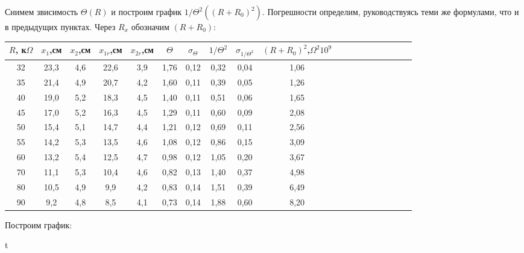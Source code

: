 \documentclass[14pt]{article}
\begin{document}
Снимем звисимость $\Theta(R)$ и построим график $1/\Theta^2((R + R_0)^2)$. Погрешности определим, руководствуясь теми же формулами, что и в предыдущих пунктах. Через $R_x$ обозначим $(R + R_0)$:

\begin{flushleft}
\begin{tabular}{|c|c|c|c|c|c|c|c|c|c|c|c|c|c|c|c|c|c|c|}
\hline
$R$, к$\Omega$&$x_1$,см&$x_2$,см&$x_{1r}$,см&$x_{2r}$,см&$\Theta$&$\sigma_\Theta$&$1/\Theta^2$&$\sigma_{1/\Theta^2}$&$(R+R_0)^2$,$\Omega^2 10^9$\\
\hline
32&23,3&4,6&22,6&3,9&1,76&0,12&0,32&0,04&1,06\\
\hline
35&21,4&4,9&20,7&4,2&1,60&0,11&0,39&0,05&1,26\\
\hline
40&19,0&5,2&18,3&4,5&1,40&0,11&0,51&0,06&1,65\\
\hline
45&17,0&5,2&16,3&4,5&1,29&0,11&0,60&0,09&2,08\\
\hline
50&15,4&5,1&14,7&4,4&1,21&0,12&0,69&0,11&2,56\\
\hline
55&14,2&5,3&13,5&4,6&1,08&0,12&0,86&0,15&3,09\\
\hline
60&13,2&5,4&12,5&4,7&0,98&0,12&1,05&0,20&3,67\\
\hline
70&11,1&5,3&10,4&4,6&0,82&0,13&1,40&0,37&4,98\\
\hline
80&10,5&4,9&9,9&4,2&0,83&0,14&1,51&0,39&6,49\\
\hline
90&9,2&4,8&8,5&4,1&0,73&0,14&1,88&0,60&8,20\\
\hline
\end{tabular}
\end{flushleft}


\newpage
Построим график:

\vspace{0.5cm}
t
\end{document}

